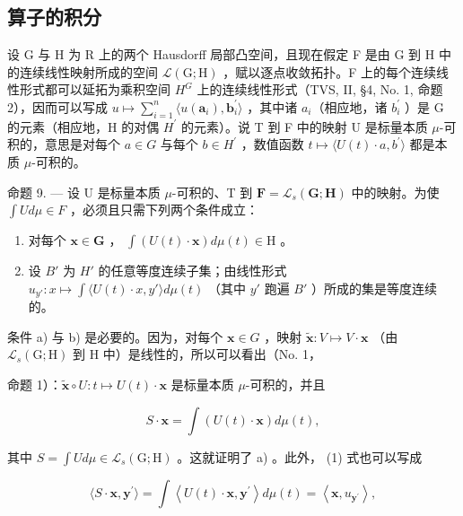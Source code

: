 \subsection{算子的积分}

设 G 与 H 为 R 上的两个 Hausdorff 局部凸空间，且现在假定 F 是由 G 到 H 中的连续线性映射所成的空间 \(\mathcal{L}(\mathrm{G};\mathrm{H})\) ，赋以逐点收敛拓扑。F 上的每个连续线性形式都可以延拓为乘积空间 \(H^{G}\) 上的连续线性形式（TVS, II, §4, No. 1, 命题 2），因而可以写成 \(u \mapsto \sum_{i=1}^{n} \langle u(\mathbf{a}_{i}), \mathbf{b}_{i}^{\prime} \rangle\) ，其中诸 \(a_{i}\)（相应地，诸 \(b_{i}^{\prime}\) ）是 G 的元素（相应地，H 的对偶 \(H^{\prime}\) 的元素）。说 T 到 F 中的映射 U 是标量本质 \(\mu\)-可积的，意思是对每个 \(a \in G\) 与每个 \(b \in H^{\prime}\) ，数值函数 \(t \mapsto \langle U(t) \cdot a, b^{\prime} \rangle\) 都是本质 \(\mu\)-可积的。

命题 9. --- 设 U 是标量本质 \(\mu\)-可积的、T 到 \(\mathbf{F} = \mathcal{L}_{s}(\mathbf{G}; \mathbf{H})\) 中的映射。为使 \(\int U d\mu \in F\) ，必须且只需下列两个条件成立：

\begin{enumerate}
\def\labelenumi{\alph{enumi})}
\item
  对每个 \(\mathbf{x} \in \mathbf{G}\) ， \(\int (U(t) \cdot \mathbf{x}) d\mu(t) \in \mathrm{H}\) 。
\item
  设 \(B'\) 为 \(H'\) 的任意等度连续子集；由线性形式 \(u_{y'} : x \mapsto \int \langle U(t) \cdot x, y' \rangle d\mu(t)\) （其中 \(y'\) 跑遍 \(B'\) ）所成的集是等度连续的。
\end{enumerate}

条件 a) 与 b) 是必要的。因为，对每个 \(\mathbf{x} \in G\) ，映射 \(\widetilde{\mathbf{x}}: V \mapsto V \cdot \mathbf{x}\) （由 \(\mathcal{L}_s(\mathrm{G};\mathrm{H})\) 到 H 中）是线性的，所以可以看出（No. 1，

命题 1）：\(\widetilde{\mathbf{x}}\circ U:t\mapsto U(t)\cdot \mathbf{x}\) 是标量本质 \(\mu\)-可积的，并且

\[
S \cdot \mathbf {x} = \int (U (t) \cdot \mathbf {x}) d \mu (t),\tag{1}
\]

其中 \(S = \int U d\mu \in \mathcal{L}_s(\mathrm{G};\mathrm{H})\) 。这就证明了 a) 。此外， (1) 式也可以写成

\[
\langle S \cdot \mathbf {x}, \mathbf {y} ^ {\prime} \rangle = \int \left\langle U (t) \cdot \mathbf {x}, \mathbf {y} ^ {\prime} \right\rangle d \mu (t) = \left\langle \mathbf {x}, u _ {\mathbf {y} ^ {\prime}} \right\rangle ,\tag{2}
\]

